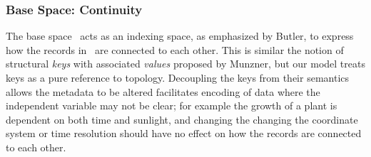 \documentclass[journal]{vgtc}                %
\begin{document}
\subsubsection{Base Space: Continuity}
\label{sec:math:data:base}

 The base space \dbase\ acts as an indexing space, as emphasized by Butler\cite{butlerVectorBundleClassesForm1992,butlerVisualizationModelBased1989}, to express how the records in \dtotal\ are connected to each other. This is similar the notion of structural \textit{keys} with associated \textit{values} proposed by Munzner\cite{munznerVisualizationAnalysisDesign2014}, but our model treats keys as a pure reference to topology. Decoupling the keys from their semantics allows the metadata to be altered facilitates encoding of data where the independent variable may not be clear; for example the growth of a plant is dependent on both time and sunlight, and changing the changing the coordinate system or time resolution should have no effect on how the records are connected to each other. 
 
\end{document}
